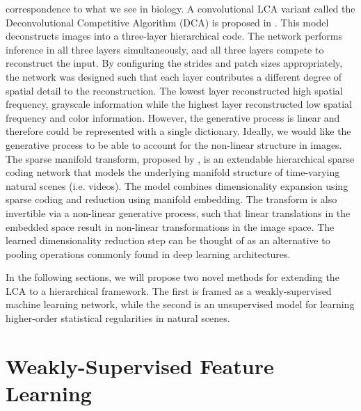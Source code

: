 correspondence to what we see in biology. A convolutional LCA variant called the Deconvolutional Competitive Algorithm (DCA) is proposed in \parencite{paiton2015deconvolutional}. This model deconstructs images into a three-layer hierarchical code. The network performs inference in all three layers simultaneously, and all three layers compete to reconstruct the input. By configuring the strides and patch sizes appropriately, the network was designed such that each layer contributes a different degree of spatial detail to the reconstruction. The lowest layer reconstructed high spatial frequency, grayscale information while the highest layer reconstructed low spatial frequency and color information. However, the generative process is linear and therefore could be represented with a single dictionary. Ideally, we would like the generative process to be able to account for the non-linear structure in images. The sparse manifold transform, proposed by \parencite{chen2018sparse}, is an extendable hierarchical sparse coding network that models the underlying manifold structure of time-varying natural scenes (i.e. videos). The model combines dimensionality expansion using sparse coding and reduction using manifold embedding. The transform is also invertible via a non-linear generative process, such that linear translations in the embedded space result in non-linear transformations in the image space. The learned dimensionality reduction step can be thought of as an alternative to pooling operations commonly found in deep learning architectures.

In the following sections, we will propose two novel methods for extending the LCA to a hierarchical framework. The first is framed as a weakly-supervised machine learning network, while the second is an unsupervised model for learning higher-order statistical regularities in natural scenes.



\section{Weakly-Supervised Feature Learning}\label{sec:ch3_weak_supervised_learning}


